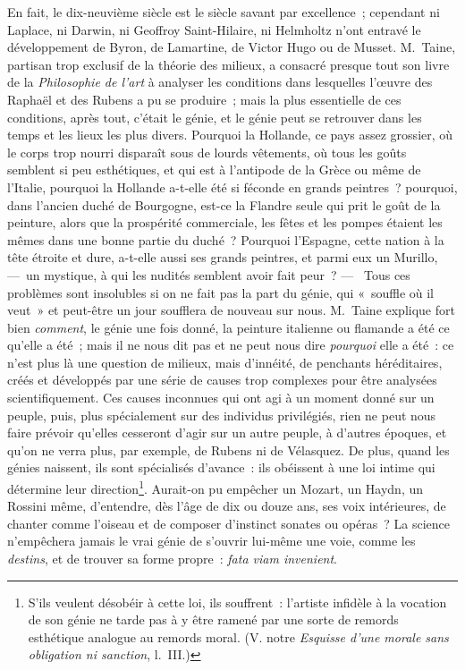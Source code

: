 \documentclass[french,twoside]{book} %
\begin{document}
En fait, le dix-neuvième siècle est le siècle savant par excellence ; cependant ni Laplace, ni Darwin, ni Geoffroy Saint-Hilaire, ni Helmholtz n’ont entravé le développement de Byron, de Lamartine, de Victor Hugo ou de Musset. M. Taine, partisan trop exclusif de la théorie des milieux, a consacré presque tout son livre de la \emph{Philosophie de l’art} à analyser les conditions dans lesquelles l’œuvre des Raphaël et des Rubens a pu se produire ; mais la plus essentielle de ces conditions, après tout, c’était le génie, et le génie peut se retrouver dans les temps et les lieux les plus divers. Pourquoi la Hollande, ce pays assez grossier, où le corps trop nourri disparaît sous de lourds vêtements, où tous les goûts semblent si peu esthétiques, et qui est à l’antipode de la Grèce ou même de l’Italie, pourquoi la Hollande a-t-elle été si féconde en grands peintres ? pourquoi, dans l’ancien duché de Bourgogne, est-ce la Flandre seule qui prit le goût de la peinture, alors que la prospérité commerciale, les fêtes et les pompes étaient les mêmes dans une bonne partie du duché ? Pourquoi l’Espagne, cette nation à la tête étroite et dure, a-t-elle aussi ses grands peintres, et parmi eux un Murillo, — un mystique, à qui les nudités semblent avoir fait peur ? —  Tous ces problèmes sont insolubles si on ne fait pas la part du génie, qui « souffle où il veut » et peut-être un jour soufflera de nouveau sur nous. M. Taine explique fort bien \emph{comment}, le génie une fois donné, la peinture italienne ou flamande a été ce qu’elle a été ; mais il ne nous dit pas et ne peut nous dire \emph{pourquoi} elle a été : ce n’est plus là une question de milieux, mais d’innéité, de penchants héréditaires, créés et développés par une série de causes trop complexes pour être analysées scientifiquement. Ces causes inconnues qui ont agi à un moment donné sur un peuple, puis, plus spécialement sur des individus privilégiés, rien ne peut nous faire prévoir qu’elles cesseront d’agir sur un autre peuple, à d’autres époques, et qu’on ne verra plus, par exemple, de Rubens ni de Vélasquez. De plus, quand les génies naissent, ils sont spécialisés d’avance : ils obéissent à une loi intime qui détermine leur direction\footnote{S’ils veulent désobéir à cette loi, ils souffrent : l’artiste infidèle à la vocation de son génie ne tarde pas à y être ramené par une sorte de remords esthétique analogue au remords moral. (V. notre \emph{Esquisse d’une morale sans obligation ni sanction}, l. III.)}. Aurait-on pu empêcher un Mozart, un Haydn, un Rossini même, d’entendre, dès l’âge de dix ou douze ans, ses voix intérieures, de chanter comme l’oiseau et de composer d’instinct sonates ou opéras ? La science n’empêchera jamais le vrai génie de s’ouvrir lui-même une voie, comme les \emph{destins}, et de trouver sa forme propre : \emph{\emph{fata viam invenient}}.
\end{document}
